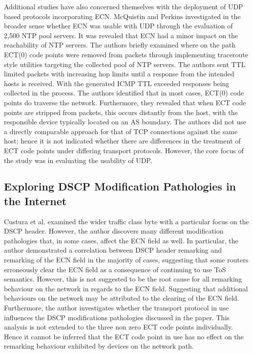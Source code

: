 \documentclass{l4proj}
\begin{document}
Additional studies have also concerned themselves with the deployment of UDP based protocols incorporating ECN. McQuistin and Perkins\cite{mcquistin_is_2015} investigated in the broader sense whether ECN was usable with UDP through the evaluation of 2,500 NTP pool servers. It was revealed that ECN had a minor impact on the reachability of NTP servers. The authors briefly examined where on the path ECT(0) code points were removed from packets through implementing traceroute style utilities targeting the collected pool of NTP servers. The authors sent TTL limited packets with increasing hop limits until a response from the intended hosts is received. With the generated ICMP TTL exceeded responses being collected in the process. The authors identified that in most cases, ECT(0) code points do traverse the network. Furthermore, they revealed that when ECT code points are stripped from packets, this occurs distantly from the host, with the responsible device typically located on an AS boundary. The authors did not use a directly comparable approach for that of TCP connections against the same host; hence it is not indicated whether there are differences in the treatment of ECT code points under differing transport protocols. However, the core focus of the study was in evaluating the usability of UDP.

\subsection{Exploring DSCP Modification Pathologies in the Internet}

Custura et al.\cite{custura_exploring_2017} examined the wider traffic class byte with a particular focus on the DSCP header. However, the author discovers many different modification pathologies that, in some cases, affect the ECN field as well. In particular, the author demonstrated a correlation between DSCP header remarking and remarking of the ECN field in the majority of cases, suggesting that some routers erroneously clear the ECN field as a consequence of continuing to use ToS semantics. However, this is not suggested to be the root cause for all remarking behaviour on the network in regards to the ECN field. Suggesting that additional behaviours on the network may be attributed to the clearing of the ECN field. Furthermore, the author investigates whether the transport protocol in use influences the DSCP modifications pathologies discussed in the paper. This analysis is not extended to the three non zero ECT code points individually. Hence it cannot be inferred that the ECT code point in use has no effect on the remarking behaviour exhibited by devices on the network path.
\end{document}
